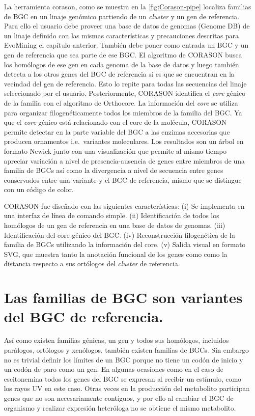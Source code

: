 \documentclass[12pt,twoside]{reedthesis}
\begin{document}
  La herramienta corason, como se muestra en la \autoref{fig:Corason-pipe}
  localiza familias de BGC en un linaje genómico partiendo de un
  \emph{cluster} y un gen de referencia. Para ello el usuario debe proveer
  una base de datos de genomas (Genome DB) de un linaje definido con las
  mismas características y precauciones descritas para EvoMining el
  capítulo anterior. También debe poner como entrada un BGC y un gen de
  referencia que sea parte de ese BGC. El algoritmo de CORASON busca los
  homólogos de ese gen en cada genoma de la base de datos y luego también
  detecta a los otros genes del BGC de referencia si es que se encuentran
  en la vecindad del gen de referencia. Esto lo repite para todas las
  secuencias del linaje seleccionado por el usuario. Posteriormente,
  CORASON identifica el \emph{core} génico de la familia con el algoritmo
  de Orthocore. La información del \emph{core} se utiliza para organizar
  filogenéticamente todos los miembros de la familia del BGC. Ya que el
  \emph{core} génico está relacionado con el core de la molécula, CORASON
  permite detectar en la parte variable del BGC a las enzimas accesorias
  que producen ornamentos i.e.~variantes moleculares. Los resultados son
  un árbol en formato Newick junto con una visualización que permite al
  mismo tiempo apreciar variación a nivel de presencia-ausencia de genes
  entre miembros de una familia de BGCs así como la divergencia a nivel de
  secuencia entre genes conservados entre una variante y el BGC de
  referencia, mismo que se distingue con un código de color.
  
  CORASON fue diseñado con las siguientes características: (i) Se
  implementa en una interfaz de línea de comando simple. (ii)
  Identificación de todos los homólogos de un gen de referencia en una
  base de datos de genomas. (iii) Identificación del core génico del BGC.
  (iv) Reconstrucción filogenética de la familia de BGCs utilizando la
  información del core. (v) Salida visual en formato SVG, que muestra
  tanto la anotación funcional de los genes como como la distancia
  respecto a sus ortólogos del \emph{cluster} de referencia.
  
  \section{Las familias de BGC son variantes del BGC de
  referencia.}\label{las-familias-de-bgc-son-variantes-del-bgc-de-referencia.}
  
  Así como existen familias génicas, un gen y todos sus homólogos,
  incluidos parálogos, ortólogos y xenólogos, también existen familias de
  BGCs. Sin embargo no es trivial definir los límites de un BGC porque no
  tiene un codón de inicio y un codón de paro como un gen. En algunas
  ocasiones como en el caso de escitonemina todos los genes del BGC se
  expresan al recibir un estímulo, como los rayos UV en este caso. Otras
  veces en la producción del metabolito participan genes que no son
  necesariamente contiguos, y por ello al cambiar el BGC de organismo y
  realizar expresión heteróloga no se obtiene el mismo metabolito.
  
\end{document}
